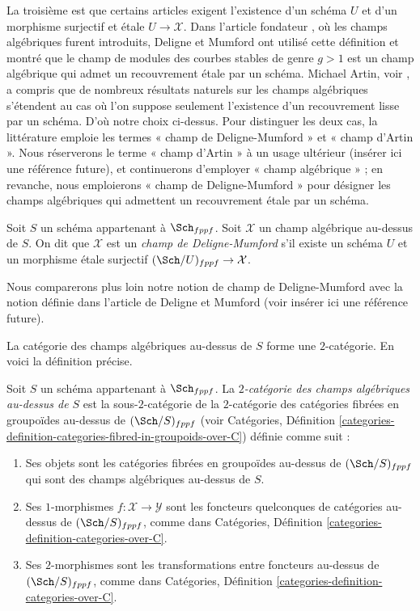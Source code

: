 \medskip\noindent
La troisième est que certains articles exigent l'existence d'un
schéma $U$ et d'un morphisme surjectif et \'etale $U \to \mathcal{X}$.
Dans l'article fondateur \cite{DM}, où les champs algébriques furent introduits,
Deligne et Mumford ont utilisé cette définition et montré que
le champ de modules des courbes stables de genre $g > 1$ est un champ algébrique
qui admet un recouvrement \'etale par un schéma. Michael Artin, voir
\cite{ArtinVersal}, a compris que de nombreux
résultats naturels sur les champs algébriques s'étendent au cas où l'on
suppose seulement l'existence d'un recouvrement lisse par un schéma. D'où notre choix ci-dessus.
Pour distinguer les deux cas, la littérature emploie les termes « champ de Deligne-Mumford »
et « champ d'Artin ». Nous réserverons le terme
« champ d'Artin » à un usage ultérieur (insérer ici une référence future), et continuerons
d'employer « champ algébrique » ; en revanche, nous emploierons « champ de Deligne-Mumford »
pour désigner les champs algébriques qui admettent un recouvrement \'etale par un
schéma.

\begin{definition}
\label{definition-deligne-mumford}
Soit $S$ un schéma appartenant à $\Sch_{fppf}$.
Soit $\mathcal{X}$ un champ algébrique au-dessus de $S$.
On dit que $\mathcal{X}$ est un {\it champ de Deligne-Mumford} s'il existe
un schéma $U$ et un morphisme \'etale surjectif
$(\Sch/U)_{fppf} \to \mathcal{X}$.
\end{definition}

\noindent
Nous comparerons plus loin notre notion de champ de Deligne-Mumford avec
la notion définie dans l'article de Deligne et Mumford
(voir insérer ici une référence future).

\medskip\noindent
La catégorie des champs algébriques au-dessus de $S$ forme une $2$-catégorie.
En voici la définition précise.

\begin{definition}
\label{definition-morphism-algebraic-stacks}
Soit $S$ un schéma appartenant à $\Sch_{fppf}$.
La {\it $2$-catégorie des champs algébriques au-dessus de $S$} est la
sous-$2$-catégorie de la $2$-catégorie des catégories fibrées en
groupoïdes au-dessus de $(\Sch/S)_{fppf}$ (voir
Catégories,
Définition \ref{categories-definition-categories-fibred-in-groupoids-over-C})
définie comme suit :
\begin{enumerate}
\item Ses objets sont les catégories fibrées en groupoïdes
au-dessus de $(\Sch/S)_{fppf}$ qui sont des champs algébriques au-dessus de $S$.
\item Ses $1$-morphismes $f : \mathcal{X} \to \mathcal{Y}$ sont
les foncteurs quelconques de catégories au-dessus de $(\Sch/S)_{fppf}$, comme dans
Catégories, Définition \ref{categories-definition-categories-over-C}.
\item Ses $2$-morphismes sont les transformations entre foncteurs
au-dessus de $(\Sch/S)_{fppf}$, comme dans
Catégories, Définition \ref{categories-definition-categories-over-C}.
\end{enumerate}
\end{definition}

